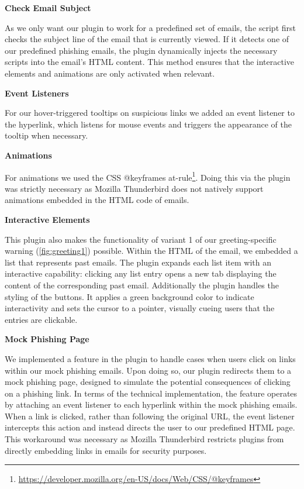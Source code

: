 \documentclass[
  a4paper,  %
  twoside,  %
  bibliography=totoc,
  headsepline,
  cleardoublepage=empty,
  parskip=half,
  draft=false
]{scrbook}
\begin{document}
\textbf{Check Email Subject}

As we only want our plugin to work for a predefined set of emails, the script first checks the subject line of the email that is currently viewed. If it detects one of our predefined phishing emails, the plugin dynamically injects the necessary scripts into the email's HTML content. This method ensures that the interactive elements and animations are only activated when relevant. 

\textbf{Event Listeners}

For our hover-triggered tooltips on suspicious links we added an event listener to the hyperlink, which listens for mouse events and triggers the appearance of the tooltip when necessary. \newpage

\textbf{Animations}

For animations we used the CSS @keyframes at-rule\footnote{ \href{https://developer.mozilla.org/en-US/docs/Web/CSS/@keyframes}{https://developer.mozilla.org/en-US/docs/Web/CSS/@keyframes}}. Doing this via the plugin was strictly necessary as Mozilla Thunderbird does not natively support animations embedded in the HTML code of emails. 

\textbf{Interactive Elements}

This plugin also makes the functionality of variant 1 of our greeting-specific warning (\ref{fig:greeting1}) possible. Within the HTML of the email, we embedded a list that represents past emails. The plugin expands each list item with an interactive capability: clicking any list entry opens a new tab displaying the content of the corresponding past email. Additionally the plugin handles the styling of the buttons. It applies a green background color to indicate interactivity and sets the cursor to a pointer, visually cueing users that the entries are clickable. 

\textbf{Mock Phishing Page}

We implemented a feature in the plugin to handle cases when users click on links within our mock phishing emails. Upon doing so, our plugin redirects them to a mock phishing page, designed to simulate the potential consequences of clicking on a phishing link. In terms of the technical implementation, the feature operates by attaching an event listener to each hyperlink within the mock phishing emails. When a link is clicked, rather than following the original URL, the event listener intercepts this action and instead directs the user to our predefined HTML page. This workaround was necessary as Mozilla Thunderbird restricts plugins from directly embedding links in emails for security purposes.
\end{document}
